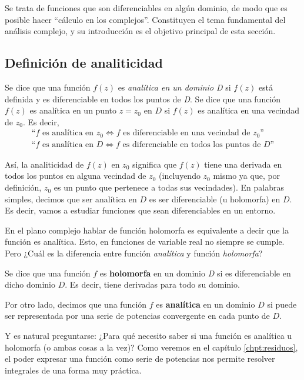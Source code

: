 Se trata de funciones que son diferenciables en algún dominio, de modo que es posible hacer ``cálculo en los complejos''. Constituyen el tema fundamental del análisis complejo, y su introducción es el objetivo principal de esta sección. 

\subsection{Definición de analiticidad}

Se dice que una función $f(z)$ es \textit{analítica en un dominio D} si $f(z)$ está definida y es diferenciable en todos los puntos de \textit{D}. Se dice que una función $f(z)$ es analítica en un punto $z=z_0$ en $D$ si $f(z)$ es analítica en una vecindad de $z_0$. Es decir, 
\begin{gather*}
  \text{``}f \text{ es analítica en }z_0 \Leftrightarrow f \text{ es diferenciable en una vecindad de }z_0\text{''} \\ 
  \text{``}f \text{ es analítica en }D \Leftrightarrow f \text{ es diferenciable en todos los puntos de }D\text{''}
\end{gather*}

Así, la analiticidad de $f(z)$ en $z_0$ significa que $f(z)$ tiene una derivada en todos los puntos en alguna vecindad de $z_0$ (incluyendo $z_0$ mismo ya que, por definición, $z_0$ es un punto que pertenece a todas sus vecindades). En palabras simples, decimos que ser analítica en $D$ es ser diferenciable (u holomorfa) en $D$. Es decir, vamos a estudiar funciones que sean diferenciables en un entorno.

En el plano complejo hablar de función holomorfa es equivalente a decir que la función es analítica. Esto, en funciones de variable real no siempre se cumple. Pero ¿Cuál es la diferencia entre función \textit{analítica} y función \textit{holomorfa}? 

Se dice que una función $f$ es \textbf{holomorfa} en un dominio \textit{D} si es diferenciable en dicho dominio $D$. Es decir, tiene derivadas para todo su dominio.

Por otro lado, decimos que una función $f$ es \textbf{analítica} en un dominio $D$ si puede ser representada por una serie de potencias convergente en cada punto de $D$. 

Y es natural preguntarse: ¿Para qué necesito saber si una función es analítica u holomorfa (o ambas cosas a la vez)? Como veremos en el capítulo \ref{chpt:residuos}, el poder expresar una función como serie de potencias nos permite resolver integrales de una forma muy práctica.

